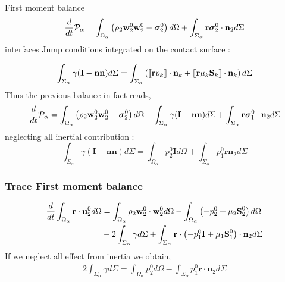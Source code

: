 \documentclass{sintefbeamer}
\begin{document}
\begin{frame}
  {First moment balance}
  \begin{equation}
    \frac{d}{dt} \mathcal{P}_\alpha
    = \int_{\Omega_\alpha} \left(
        \rho_2  \textbf{w}_2^0 \textbf{w}_2^0 
        - \bm{\sigma}_2^0
    \right) d\Omega
    + \int_{\Sigma_\alpha} \textbf{r}\bm{\sigma}_2^0\cdot\textbf{n}_2 d\Sigma
\end{equation}
interfaces Jump conditions integrated  on the contact surface :

\begin{equation}
  \int_{\Sigma_\alpha}
  \gamma (\textbf{I}-\textbf{nn})
  d\Sigma
  = 
  \int_{\Sigma_\alpha}\left(
    \llbracket \textbf{r}p_k \rrbracket \cdot \textbf{n}_k
    +
    \llbracket \textbf{r}\mu_k\textbf S_k  \rrbracket \cdot \textbf{n}_k
    \right)
  d\Sigma
\end{equation}
Thus the previous balance in fact reads,
\begin{equation}
  \frac{d}{dt} \mathcal{P}_\alpha
  = \int_{\Omega_\alpha} \left(
      \rho_2  \textbf{w}_2^0 \textbf{w}_2^0 
      - \bm{\sigma}_2^0
  \right) d\Omega
  -\int_{\Sigma_\alpha}
  \gamma (\textbf{I}-\textbf{nn})
  d\Sigma 
  + \int_{\Sigma_\alpha} \textbf{r}\bm{\sigma}_1^0\cdot\textbf{n}_2 d\Sigma
\end{equation}
neglecting all inertial contribution : 
\begin{equation}
  \int_{\Sigma_\alpha}
  \gamma (\textbf{I}-\textbf{nn})
  d\Sigma 
  = \int_{\Omega_\alpha}
      p_2^0 \textbf{I}
   d\Omega
  + \int_{\Sigma_\alpha} p_1^0 \textbf{r}\textbf{n}_2 d\Sigma
\end{equation}



\end{frame}
\begin{frame}
  \frametitle{Trace First moment balance}
  \begin{align*}
    \frac{d}{dt} \int_{\Omega_\alpha}
    \textbf{r}\cdot\textbf{u}_2^0
    d\Omega
    &= \int_{\Omega_\alpha} 
    \rho_2  \textbf{w}_2^0 \cdot\textbf{w}_2^0 
    d\Omega
    - \int_{\Omega_\alpha} \left(
        - p_2^0
        + \mu_2\textbf{S}^0_2
    \right) d\Omega\\
    &-2\int_{\Sigma_\alpha}
    \gamma 
    d\Sigma 
    + \int_{\Sigma_\alpha} \textbf{r}\cdot \left(
      - p_1^0 \textbf{I}
      + \mu_1\textbf{S}^0_1
  \right)\cdot\textbf{n}_2 d\Sigma
  \end{align*}
  If we neglect all effect from inertia we obtain, 
  \begin{align*}
    2\int_{\Sigma_\alpha}
    \gamma 
    d\Sigma 
    =
    \int_{\Omega_\alpha} 
        p_2^0
     d\Omega
    - \int_{\Sigma_\alpha}
       p_1^0
      \textbf{r}\cdot \textbf{n}_2 d\Sigma
  \end{align*}
  

\end{frame}
\end{document}
